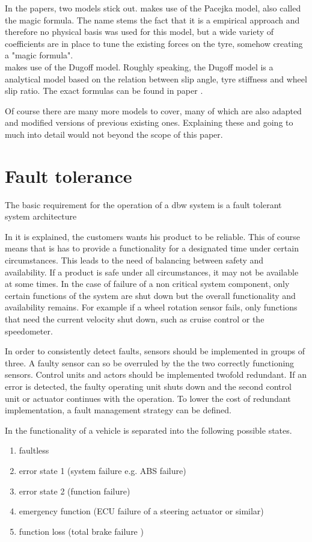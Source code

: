 \documentclass[conference]{IEEEtran}
\begin{document}
In the papers, two models stick out. \cite{Se-Wook} makes use of the Pacejka model, also called the magic formula. The name stems the fact that it is a empirical approach and therefore no physical basis was used for this model, but a wide variety of coefficients are in place to tune the existing forces on the tyre, somehow creating a "magic formula".\\
\cite{Weidong} makes use of the Dugoff model. Roughly speaking, the Dugoff model is a analytical model based on the relation between slip angle, tyre stiffness and wheel slip ratio. The exact formulas can be found in paper \cite{Weidong}.

Of course there are many more models to cover, many of which are also adapted and modified versions of previous existing ones. Explaining these and going to much into detail would not beyond the scope of this paper.

\section{Fault tolerance}
The basic requirement for the operation of a dbw system is a fault tolerant system architecture %

In \cite{Lenkungshandbuch} it is explained, the customers wants his product to be reliable. This of course means that is has to provide a functionality for a designated time under certain circumstances. This leads to the need of balancing between safety and availability. If a product is safe under all circumstances, it may not be available at some times. In the case of failure of a non critical system component, only certain functions of the system are shut down but the overall functionality and availability remains. For example if a wheel rotation sensor fails, only functions that need the current velocity shut down, such as cruise control or the speedometer.

In order to consistently detect faults, sensors should be implemented in groups of three. A faulty sensor can so be overruled by the the two correctly functioning sensors. Control units and actors should be implemented twofold redundant. If an error is detected, the faulty operating unit shuts down and the second control unit or actuator continues with the operation. To lower the cost of redundant implementation, a fault management strategy can be defined. 

In \cite{Lenkungshandbuch} the functionality of a vehicle is separated into the following possible states. 
\begin{enumerate}
	\item faultless
	\item error state 1 (system failure e.g. ABS failure)
	\item error state 2 (function failure)
	\item emergency function (ECU failure of a steering actuator or similar)
	\item function loss (total brake failure	)
\end{enumerate}
\end{document}
